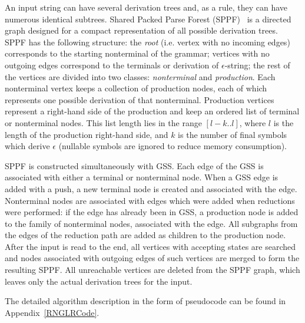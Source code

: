An input string can have several derivation trees and, as a rule, they can have 
numerous identical subtrees. Shared Packed Parse Forest (SPPF)~\cite{SPPF} is a directed graph
designed for a compact representation of all possible derivation trees.  
SPPF has the following structure: the \emph{root} (i.e. vertex with no incoming edges) corresponds 
to the starting nonterminal of the grammar; vertices with no outgoing edges correspond to the terminals 
or derivation of $\epsilon$-string; the rest of the vertices are divided into two classes: \emph{nonterminal} 
and \emph{production}. Each nonterminal vertex keeps a collection of production nodes, each of which represents one  
possible derivation of that nonterminal. Production vertices represent a right-hand side of the 
production and keep an ordered list of terminal or nonterminal nodes. This list length lies
in the range $[l-k..l]$, where $l$ is the length of the production right-hand side, and $k$ is 
the number of final symbols which derive $\epsilon$ (nullable symbols are ignored to reduce memory consumption).

SPPF is constructed simultaneously with GSS. Each edge of the GSS is associated with either 
a terminal or nonterminal node. When a GSS edge is added with a push, 
a new terminal node is created and associated with the edge. Nonterminal nodes are associated
with edges which were added when reductions were performed: if the edge has already been in GSS, 
a production node is added to the family of nonterminal nodes, associated with the edge. All subgraphs 
from the edges of the reduction path are added as children to the production node. After the input 
is read to the end, all vertices with accepting states are searched and nodes associated with 
outgoing edges of such vertices are merged to form the resulting SPPF. All unreachable vertices 
are deleted from the SPPF graph, which leaves only the actual derivation trees for the input.

The detailed algorithm description in the form of pseudocode can be found in Appendix~\ref{RNGLRCode}.
